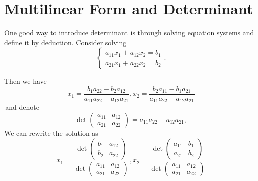 \chapter{Multilinear Form and Determinant}
One good way to introduce determinant is through solving equation systems and define it by deduction. Consider solving
$$\begin{cases}
    a_{11}x_{1}+a_{12}x_2=b_1 \\
    a_{21}x_{1}+a_{22}x_2=b_2
\end{cases}.$$

Then we have
$$x_1=\frac{b_1 a_{22}- b_2 a_{12}}{a_{11} a_{22}- a_{12} a_{21}}, x_2=\frac{b_2 a_{11}- b_1 a_{21}}{a_{11} a_{22}- a_{12} a_{21}}$$
\,and denote $$\operatorname{det} \begin{pmatrix} a_{11} & a_{12} \\ a_{21} & a_{22} \end{pmatrix} = a_{11} a_{22}- a_{12} a_{21},$$ 
We can rewrite the solution as
$$x_1=\frac{\operatorname{det} \begin{pmatrix} b_{1} & a_{12} \\ b_{2} & a_{22} \end{pmatrix}}{\operatorname{det} \begin{pmatrix} a_{11} & a_{12} \\ a_{21} & a_{22} \end{pmatrix}}, x_2=\frac{\operatorname{det} \begin{pmatrix} a_{11} & b_{1} \\ a_{21} & b_{2} \end{pmatrix}}{\operatorname{det} \begin{pmatrix} a_{11} & a_{12} \\ a_{21} & a_{22} \end{pmatrix}}$$

